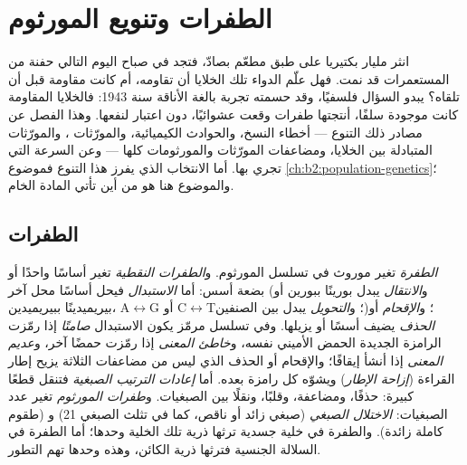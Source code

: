 \chapter{الطفرات وتنويع المورثوم}\label{ch:b2:genome-diversification}

انثر مليار بكتيريا على طبق مطعّم بصادّ، فتجد في صباح اليوم التالي
حفنة من المستعمرات قد نمت. فهل علّم الدواء تلك الخلايا أن تقاومه، أم
كانت مقاومة قبل أن تلقاه؟ يبدو السؤال فلسفيًا، وقد حسمته تجربة
بالغة الأناقة سنة 1943: فالخلايا المقاومة كانت موجودة سلفًا، أنتجتها
طفرات وقعت عشوائيًا، دون اعتبار لنفعها. وهذا الفصل عن مصادر ذلك
التنوع --- أخطاء النسخ، والحوادث الكيميائية، والمورّثات ،
والمورّثات المتبادلة بين الخلايا، ومضاعفات المورّثات والمورثومات
كلها --- وعن السرعة التي تجري بها. أما الانتخاب الذي يفرز هذا
التنوع فموضوع \cref{ch:b2:population-genetics}؛ والموضوع هنا هو من
أين تأتي المادة الخام.

\section{الطفرات}

\begin{definition}\label{def:b2:genome-diversification:mutation}
\emph{الطفرة} تغير موروث في تسلسل المورثوم. و\emph{الطفرات النقطية}
تغير أساسًا واحدًا أو بضعة أسس: أما \emph{الاستبدال} فيحل أساسًا محل
آخر (و\emph{الانتقال} يبدل بورينًا ببورين أو بيريميدينًا
ببيريميدين، A$\leftrightarrow$G أو C$\leftrightarrow$T؛
و\emph{التحويل} يبدل بين الصنفين)؛ و\emph{الإقحام} أو
\emph{الحذف} يضيف أسسًا أو يزيلها. وفي تسلسل مرمّز يكون الاستبدال
\emph{صامتًا} إذا رمّزت الرامزة الجديدة الحمض الأميني نفسه،
و\emph{خاطئ المعنى} إذا رمّزت حمضًا آخر، و\emph{عديم المعنى} إذا
أنشأ إيقافًا؛ والإقحام أو الحذف الذي ليس من مضاعفات الثلاثة يزيح
إطار القراءة (\emph{إزاحة الإطار}) ويشوّه كل رامزة بعده. أما
\emph{إعادات الترتيب الصبغية} فتنقل قطعًا كبيرة: حذفًا، ومضاعفة،
وقلبًا، ونقلًا بين الصبغيات. و\emph{طفرات المورثوم} تغير عدد
الصبغيات: \emph{الاختلال الصبغي} (صبغي زائد أو ناقص، كما في تثلث
الصبغي 21) و\emph{} (طقوم كاملة زائدة). والطفرة
في خلية جسدية ترثها ذرية تلك الخلية وحدها؛ أما الطفرة في السلالة
الجنسية فترثها ذرية الكائن، وهذه وحدها تهم التطور.
\end{definition}

